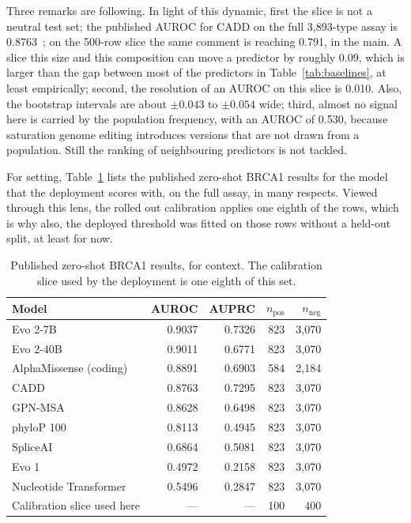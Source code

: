 \documentclass[10pt,journal]{IEEEtran}
\begin{document}
Three remarks are following. In light of this dynamic, first the slice is not a neutral test set; the published AUROC for CADD on the full 3{,}893-type assay is 0.8763~\cite{brixi2026evo2}; on the 500-row slice the same comment is reaching 0.791, in the main. A slice this size and this composition can move a predictor by roughly 0.09, which is larger than the gap between most of the predictors in Table~\ref{tab:baselines}, at least empirically; second, the resolution of an AUROC on this slice is 0.010. Also, the bootstrap intervals are about $\pm0.043$ to $\pm0.054$ wide; third, almost no signal here is carried by the population frequency, with an AUROC of 0.530, because saturation genome editing introduces versions that are not drawn from a population. Still the ranking of neighbouring predictors is not tackled.

For setting, Table~\ref{tab:evo2} lists the published zero-shot BRCA1 results for the model that the deployment scores with, on the full assay, in many respects. Viewed through this lens, the rolled out calibration applies one eighth of the rows, which is why also, the deployed threshold was fitted on those rows without a held-out split, at least for now.

\begin{table}[!t]
\caption{Published zero-shot BRCA1 results, for context. The calibration slice used by the deployment is one eighth of this set.}
\label{tab:evo2}
\centering
\begin{tabular}{@{}lrrrr@{}}
\toprule
Model & AUROC & AUPRC & $n_{\mathrm{pos}}$ & $n_{\mathrm{neg}}$ \\
\midrule
Evo 2-7B & 0.9037 & 0.7326 & 823 & 3{,}070 \\
Evo 2-40B & 0.9011 & 0.6771 & 823 & 3{,}070 \\
AlphaMissense (coding) & 0.8891 & 0.6903 & 584 & 2{,}184 \\
CADD & 0.8763 & 0.7295 & 823 & 3{,}070 \\
GPN-MSA & 0.8628 & 0.6498 & 823 & 3{,}070 \\
phyloP 100 & 0.8113 & 0.4945 & 823 & 3{,}070 \\
SpliceAI & 0.6864 & 0.5081 & 823 & 3{,}070 \\
Evo 1 & 0.4972 & 0.2158 & 823 & 3{,}070 \\
Nucleotide Transformer & 0.5496 & 0.2847 & 823 & 3{,}070 \\
\midrule
Calibration slice used here & --- & --- & 100 & 400 \\
\bottomrule
\end{tabular}
\end{table}
\end{document}
